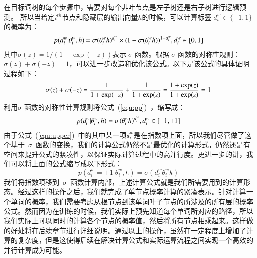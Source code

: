 在目标词树的每个步骤中，需要对每个非叶节点是左子树还是右子树进行逻辑预测。 所以当给定$ i^{th} $节点和隐藏层的输出向量$h$的时候，可以计算标签 $d^w_i\in \{-1,1\}$的概率为：
 \begin{equation}\label{equ:pp}
\setlength{\abovedisplayskip}{10pt}
\setlength{\belowdisplayskip}{10pt}
 p(d^w_i|\theta_{i}^w,h) =\sigma(\theta_{i}^w h)^{d_i^w}\times(1-\sigma(\theta_{i}^w h))^{1-{d_i^w}},d_i^w \in [0,1]
\end{equation}
其中$ \sigma(z)= 1 /(1 + \exp(-z))$表示 $\sigma$ 函数。根据 $\sigma$ 函数的对称性规则：$\sigma(z)+ \sigma(-z)=1$，可以进一步改造和优化该公式。以下是该公式的具体证明过程如下：
\begin{equation}\label{equ:sig}
\setlength{\abovedisplayskip}{10pt}
\setlength{\belowdisplayskip}{10pt}
\sigma(z)+ \sigma(-z)  =\frac{1}{1 + \exp(-z)}+\frac{1}{1 + \exp(z)}=\frac{1 + \exp(z)}{1 + \exp(z)}=1
\end{equation}
利用$\sigma$ 函数的对称性计算规则将公式~(\ref{equ:pp})~，缩写成：
 \begin{equation}\label{equ:upper}
\setlength{\abovedisplayskip}{10pt}
\setlength{\belowdisplayskip}{10pt}
p(d^w_i|\theta_{i}^w,h) =\sigma(\theta_{i}^w h)^{d_i^w}, d_i^w \in [-1,+1]
\end{equation}
由于公式~(\ref{equ:upper})~中的其中某一项${d_i^w}$是在指数项上面，所以我们尽管做了这个基于~$\sigma$~函数的变换，我们的计算公式仍然不是最优化的计算形式，仍然还是有空间来提升公式的紧凑性，以保证实际计算过程中的高并行度。更进一步的讲，我们可以将上面的公式缩写成以下形式：
\begin{equation}
p(d^w_i=\pm 1|\theta_{i}^w,h) = \sigma({d_i^w}\theta_{i}^w h)
\end{equation}
我们将指数项移到~$\sigma$~函数计算内部，上述计算公式就是我们所需要用到的计算形态。经过这样的操作之后，我们就完成了单节点概率计算的紧凑表示。针对计算一个单词的概率，我们需要考虑从根节点到该单词叶子节点的所涉及的所有层的概率公式。然而因为在训练的时候，我们实际上预先知道每个单词所对应的路径，所以我们实际上可以同时的计算各个节点的概率值，然后将所有节点相乘起来。这样做的好处将在后续章节进行详细说明。通过以上的操作，虽然在一定程度上增加了计算的复杂度，但是这使得后续在解决计算公式和实际运算流程之间实现一个高效的并行计算成为可能。


